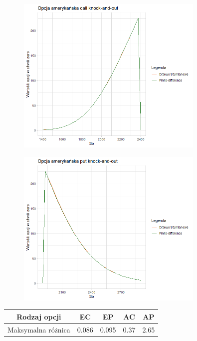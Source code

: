 \documentclass[12pt]{article}
\begin{document}
\begin{figure}[H]
    \centering
    \includegraphics[width=0.8\textwidth,height=\textheight,keepaspectratio]{ac_porownanie.png}
    \label{fig:ac}
\end{figure}

\begin{figure}[H]
    \centering
    \includegraphics[width=0.8\textwidth,height=\textheight,keepaspectratio]{ap_porownanie.png}
    \label{fig:ap}
\end{figure}

\begin{tabular}{c||c|c|c|c}
    Rodzaj opcji & EC & EP & AC & AP \\
    \hline
    Maksymalna różnica & 0.086 & 0.095 & 0.37 & 2.65
\end{tabular}\\
\end{document}
